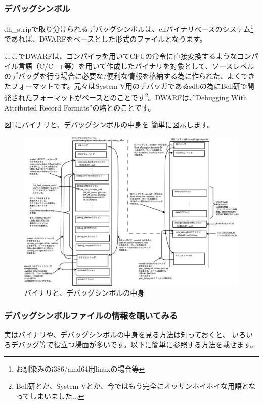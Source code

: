 \documentclass[mingoth,a4paper]{jsarticle}
\begin{document}
\subsubsection{デバッグシンボル}

 dh\_stripで取り分けられるデバッグシンボルは、elfバイナリベースのシステム\footnote{お馴染みのi386/amd64用linuxの場合等}であれば、DWARF\cite{dwarf-spec}をベースとした形式のファイルとなります。

 ここでDWARFは、コンパイラを用いてCPUの命令に直接変換するようなコンパイル言語（C/C++等）を用いて作成したバイナリを対象として、ソースレベルのデバッグを行う場合に必要な/便利な情報を格納する為に作られた、よくできたフォーマットです。元々はSystem V用のデバッガであるsdbの為にBell研で開発されたフォーマットがベースとのことです\footnote{Bell研とか、System Vとか、今ではもう完全にオッサンホイホイな用語となってしまいました...}。DWARFは、''Debugging With Attributed Record Formats''の略とのことです。

 図\ref{fig:dwarf-vs-elf-schema}にバイナリと、デバッグシンボルの中身を
簡単に図示します。

\begin{figure}[h]
\begin{center}
\includegraphics[width=0.8\hsize]{image201307/dwarf-elf-schema.eps}
 \caption{バイナリと、デバッグシンボルの中身}
 \label{fig:dwarf-vs-elf-schema}
\end{center}
\end{figure}

\subsubsection{デバッグシンボルファイルの情報を覗いてみる}

 実はバイナリや、デバッグシンボルの中身を見る方法は知っておくと、
いろいろデバッグ等で役立つ場面が多いです。以下に簡単に参照する方法を載せます。
\end{document}
